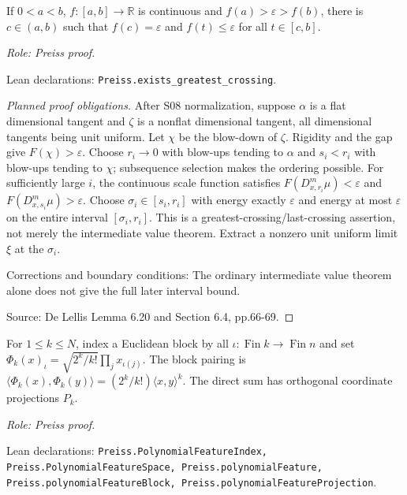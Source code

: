 \begin{lemma}
\label{lem:greatest-crossing}



If $0<a<b$, $f:[a,b]\to\mathbb R$ is continuous and $f(a)>\varepsilon>f(b)$, there is $c\in(a,b)$ such that $f(c)=\varepsilon$ and $f(t)\leq\varepsilon$ for all $t\in[c,b]$.
\par\emph{Role: Preiss proof.}
\par Lean declarations: \texttt{Preiss.exists\_greatest\_crossing}.
\end{lemma}
\begin{proof}[Planned proof obligations]
After S08 normalization, suppose $\alpha$ is a flat dimensional tangent and
$\zeta$ is a nonflat dimensional tangent, all dimensional tangents being unit
uniform. Let $\chi$ be the blow-down of $\zeta$. Rigidity and the gap give
$F(\chi)>\varepsilon$. Choose $r_i\to0$ with blow-ups tending to $\alpha$
and $s_i<r_i$ with blow-ups tending to $\chi$; subsequence selection makes
the ordering possible. For sufficiently large $i$, the continuous scale
function satisfies $F(D_{x,r_i}^m\mu)<\varepsilon$ and
$F(D_{x,s_i}^m\mu)>\varepsilon$.
Choose $\sigma_i\in[s_i,r_i]$ with energy exactly $\varepsilon$ and energy
at most $\varepsilon$ on the entire interval $[\sigma_i,r_i]$.
This is a greatest-crossing/last-crossing assertion, not merely the intermediate
value theorem. Extract a nonzero unit uniform limit $\xi$ at the $\sigma_i$.
\par Corrections and boundary conditions: The ordinary intermediate value theorem alone does not give the full later interval bound.
\par Source: De Lellis Lemma 6.20 and Section 6.4, pp.66-69.
\end{proof}

\begin{definition}
\label{def:polynomial-feature}
\uses{}


For $1\leq k\leq N$, index a Euclidean block by all $\iota:\operatorname{Fin}k\to\operatorname{Fin}n$ and set $\Phi_k(x)_\iota=\sqrt{2^k/k!}\prod_j x_{\iota(j)}$. The block pairing is $\langle\Phi_k(x),\Phi_k(y)\rangle=(2^k/k!)\langle x,y\rangle^k$. The direct sum has orthogonal coordinate projections $P_k$.
\par\emph{Role: Preiss proof.}
\par Lean declarations: \texttt{Preiss.PolynomialFeatureIndex, Preiss.PolynomialFeatureSpace, Preiss.polynomialFeature, Preiss.polynomialFeatureBlock, Preiss.polynomialFeatureProjection}.
\end{definition}

